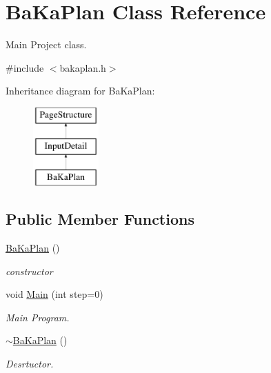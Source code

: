 \hypertarget{classBaKaPlan}{\section{Ba\-Ka\-Plan Class Reference}
\label{classBaKaPlan}
}


Main Project class.  




{\ttfamily \#include $<$bakaplan.\-h$>$}

Inheritance diagram for Ba\-Ka\-Plan\-:\begin{figure}[H]
\begin{center}
\leavevmode
\includegraphics[height=3.000000cm]{classBaKaPlan}
\end{center}
\end{figure}
\subsection*{Public Member Functions}
\begin{DoxyCompactItemize}
\item 
\hypertarget{classBaKaPlan_ab5d60f1b75c11a57f7998b709436dd03}{\hyperlink{classBaKaPlan_ab5d60f1b75c11a57f7998b709436dd03}{Ba\-Ka\-Plan} ()}\label{classBaKaPlan_ab5d60f1b75c11a57f7998b709436dd03}

\begin{DoxyCompactList}\small\item\em constructor \end{DoxyCompactList}\item 
void \hyperlink{classBaKaPlan_ae45ff4492dd7282c9bd4f0fe16a949ad}{Main} (int step=0)
\begin{DoxyCompactList}\small\item\em Main Program. \end{DoxyCompactList}\item 
\hyperlink{classBaKaPlan_aa68c1ddc933bfce4856982527467f679}{$\sim$\-Ba\-Ka\-Plan} ()
\begin{DoxyCompactList}\small\item\em Desrtuctor. \end{DoxyCompactList}\end{DoxyCompactItemize}
